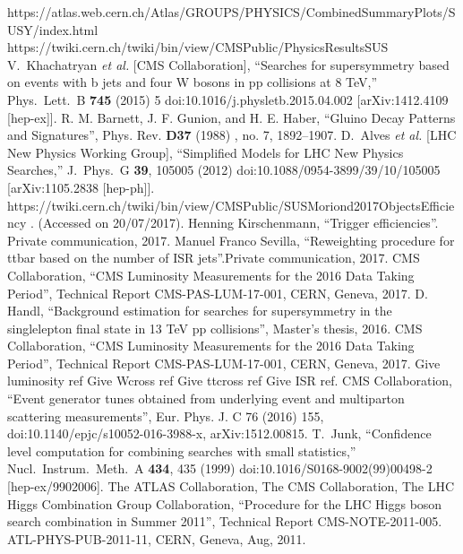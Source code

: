 \begin{thebibliography}{9}
https://atlas.web.cern.ch/Atlas/GROUPS/PHYSICS/CombinedSummaryPlots/SUSY/index.html 
  https://twiki.cern.ch/twiki/bin/view/CMSPublic/PhysicsResultsSUS
    V.~Khachatryan {\it et al.} [CMS Collaboration],
  ``Searches for supersymmetry based on events with b jets and four W bosons in pp collisions at 8 TeV,''
  Phys.\ Lett.\ B {\bf 745} (2015) 5
  doi:10.1016/j.physletb.2015.04.002
  [arXiv:1412.4109 [hep-ex]].
R. M. Barnett, J. F. Gunion, and H. E. Haber, “Gluino Decay Patterns and Signatures”, Phys. Rev. \textbf{D37} (1988) , no. 7, 1892–1907.
D.~Alves {\it et al.} [LHC New Physics Working Group],
  ``Simplified Models for LHC New Physics Searches,''
  J.\ Phys.\ G {\bf 39}, 105005 (2012)
  doi:10.1088/0954-3899/39/10/105005
  [arXiv:1105.2838 [hep-ph]].
https://twiki.cern.ch/twiki/bin/view/CMSPublic/SUSMoriond2017ObjectsEfficiency . (Accessed on 20/07/2017).
Henning Kirschenmann, “Trigger efficiencies”. Private communication, 2017.
Manuel Franco Sevilla, “Reweighting procedure for ttbar based on the number of ISR jets''.Private communication, 2017.
CMS Collaboration, “CMS Luminosity Measurements for the 2016 Data Taking Period”, Technical Report CMS-PAS-LUM-17-001, CERN, Geneva, 2017.
D. Handl, “Background estimation for searches for supersymmetry in the singlelepton final state in 13 TeV pp collisions”, Master’s thesis, 2016.
CMS Collaboration, “CMS Luminosity Measurements for the 2016 Data Taking Period”, Technical Report CMS-PAS-LUM-17-001, CERN, Geneva, 2017.
Give luminosity ref
Give Wcross ref
Give ttcross ref
Give ISR ref.
CMS Collaboration, “Event generator tunes obtained from underlying event and multiparton scattering measurements”, 
Eur. Phys. J. C 76 (2016) 155, doi:10.1140/epjc/s10052-016-3988-x, arXiv:1512.00815.
  T.~Junk,
  ``Confidence level computation for combining searches with small statistics,''
  Nucl.\ Instrum.\ Meth.\ A {\bf 434}, 435 (1999)
  doi:10.1016/S0168-9002(99)00498-2
  [hep-ex/9902006].
The ATLAS Collaboration, The CMS Collaboration, The LHC Higgs Combination Group Collaboration, “Procedure for the LHC Higgs boson search combination in Summer 2011”, Technical Report CMS-NOTE-2011-005. ATL-PHYS-PUB-2011-11, CERN, Geneva, Aug, 2011.

\end{thebibliography}
